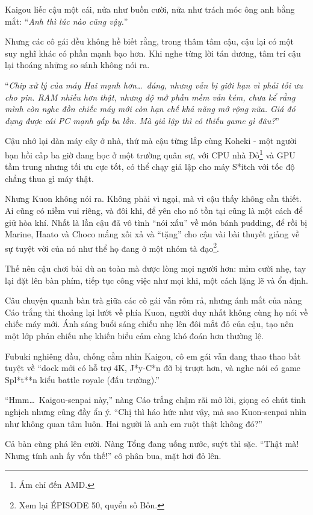 \documentclass[../main.tex]{subfiles}
\begin{document}
Kaigou liếc cậu một cái, nửa như buồn cười, nửa như trách móc ông anh bằng mắt: ``\textit{Anh thì lúc nào cũng vậy.}''

Nhưng các cô gái đều không hề biết rằng, trong thâm tâm cậu, cậu lại có một suy nghĩ khác có phần mạnh bạo hơn. Khi nghe từng lời tán dương, tâm trí cậu lại thoáng những so sánh không nói ra.

``\textit{Chip xử lý của máy Hai mạnh hơn\dots\ đúng, nhưng vẫn bị giới hạn vì phải tối ưu cho pin. RAM nhiều hơn thật, nhưng độ mở phần mềm vẫn kém, chưa kể rằng mình còn nghe đồn chiếc máy mới còn hạn chế khả năng mở rộng nữa. Giá đó dựng được cái PC mạnh gấp ba lần. Mà giả lập thì có thiếu game gì đâu?}''

Cậu nhớ lại dàn máy cây ở nhà, thứ mà cậu từng lắp cùng Koheki - một người bạn hồi cấp ba giờ đang học ở một trường quân sự, với CPU nhà Đỏ\footnote{Ám chỉ đến AMD.} và GPU tầm trung nhưng tối ưu cực tốt, có thể chạy giả lập cho máy S*itch với tốc độ chẳng thua gì máy thật.

Nhưng Kuon không nói ra. Không phải vì ngại, mà vì cậu thấy không cần thiết. Ai cũng có niềm vui riêng, và đôi khi, để yên cho nó tồn tại cũng là một cách để giữ hòa khí. Nhất là lần  cậu đã vô tình ``nói xấu'' về món bánh pudding, để rồi bị Marine, Haato và Choco mắng xối xả và ``tặng'' cho cậu vài bài thuyết giảng về sự tuyệt vời của nó như thể họ đang ở một nhóm tà đạo\footnote{Xem lại {\flaregothic ÉPISODE 50}, quyển số Bốn.}.

Thế nên cậu chơi bài dù an toàn mà được lòng mọi người hơn: mỉm cười nhẹ, tay lại đặt lên bàn phím, tiếp tục công việc như mọi khi, một cách lặng lẽ và ổn định.

Câu chuyện quanh bàn trà giữa các cô gái vẫn rôm rả, nhưng ánh mắt của nàng Cáo trắng thi thoảng lại lướt về phía Kuon, người duy nhất không cùng họ nói về chiếc máy mới. Ánh sáng buổi sáng chiếu nhẹ lên đôi mắt đỏ của cậu, tạo nên một lớp phản chiếu nhẹ khiến biểu cảm càng khó đoán hơn thường lệ.

Fubuki nghiêng đầu, chống cằm nhìn Kaigou, cô em gái vẫn đang thao thao bất tuyệt về ``dock mới có hỗ trợ 4K, J*y-C*n đỡ bị trượt hơn, và nghe nói có game Spl*t**n kiểu battle royale (đấu trường).''

``Hmm\dots\ Kaigou-senpai này,'' nàng Cáo trắng chậm rãi mở lời, giọng có chút tinh nghịch nhưng cũng đầy ẩn ý. ``Chị thì háo hức như vậy, mà sao Kuon-senpai nhìn như không quan tâm luôn. Hai người là anh em ruột thật không đó?''

Cả bàn cùng phá lên cười. Nàng Tổng đang uống nước, suýt thì sặc. ``Thật mà! Nhưng tính anh ấy vốn thế!'' cô phân bua, mặt hơi đỏ lên.
\end{document}
